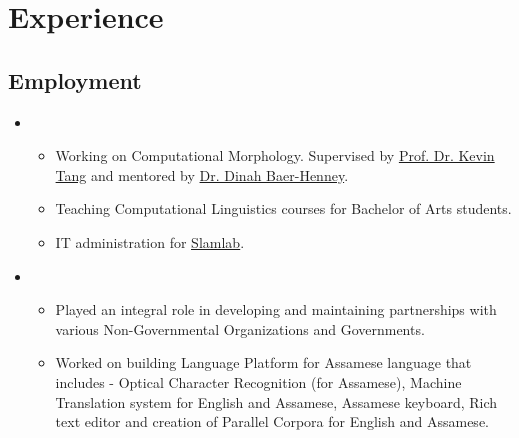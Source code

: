 \documentclass[11pt,a4paper,sans]{moderncv}
\begin{document}
\makecvtitle

\section{Experience}

\vspace{3pt}

\subsection{Employment}

\vspace{6pt}

\begin{itemize}

\item{}

\begin{itemize}
    \item Working on Computational Morphology. Supervised by \href{https://kevintang.org}{Prof. Dr. Kevin Tang} and mentored by \href{https://blogs.phil.hhu.de/dbh13/}{Dr. Dinah Baer-Henney}.
    
    \item Teaching Computational Linguistics courses for Bachelor of Arts students. 

    \item IT administration for \href{https://slam.phil.hhu.de/}{\underline{Slamlab}}.
    
\end{itemize}

\vspace{6pt}


\item{}

\begin{itemize}
    \item Played an integral role in developing and maintaining partnerships with various Non-Governmental Organizations and Governments.
    
    \item Worked on building Language Platform for Assamese language that includes - Optical Character Recognition (for Assamese), Machine Translation system for English and Assamese, Assamese keyboard, Rich text editor and creation of Parallel Corpora for English and Assamese.
    

\end{itemize}
\end{itemize}
\end{document}
